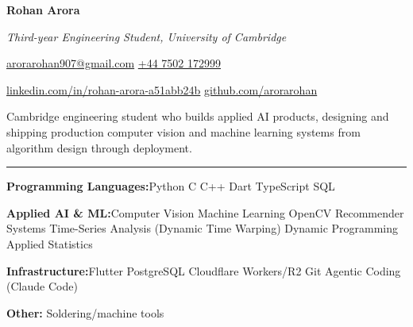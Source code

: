 \documentclass[11pt]{article}
\newcommand{\cvsection}[1]{%
  \vspace{10pt}%
  \noindent{\large\bfseries\MakeUppercase{#1}}\par
  \vspace{-4pt}\noindent\rule{\linewidth}{0.7pt}\vspace{4pt}%
}
\newcommand{\sep}{\quad\textbar\quad}
\begin{document}
\begin{center}
  {\Huge\bfseries Rohan Arora}\par
  \vspace{4pt}
  {\Large\itshape Third-year Engineering Student, University of Cambridge}\par
  \vspace{6pt}
  \href{mailto:arorarohan907@gmail.com}{arorarohan907@gmail.com}
  \sep
  \href{tel:+447502172999}{+44 7502 172999}\par
  \vspace{2pt}
  \href{https://www.linkedin.com/in/rohan-arora-a51abb24b/}{linkedin.com/in/rohan-arora-a51abb24b}
  \sep \href{https://github.com/arorarohan}{github.com/arorarohan}
\end{center}

\vspace{6pt}

Cambridge engineering student who builds applied AI products, designing and shipping production computer vision and machine learning systems from algorithm design through deployment.

\cvsection{Skills}
\textbf{Programming Languages:}\quad\quad Python \sep C \sep C++ \sep Dart \sep TypeScript \sep SQL

\textbf{Applied AI \& ML:}\quad\quad Computer Vision \sep Machine Learning \sep OpenCV \sep Recommender Systems \sep Time-Series Analysis (Dynamic Time Warping) \sep Dynamic Programming \sep Applied Statistics

\textbf{Infrastructure:}\quad\quad Flutter \sep PostgreSQL \sep Cloudflare Workers\slash R2 \sep Git \sep Agentic Coding (Claude Code)

\textbf{Other:} Soldering\slash machine tools
\end{document}
